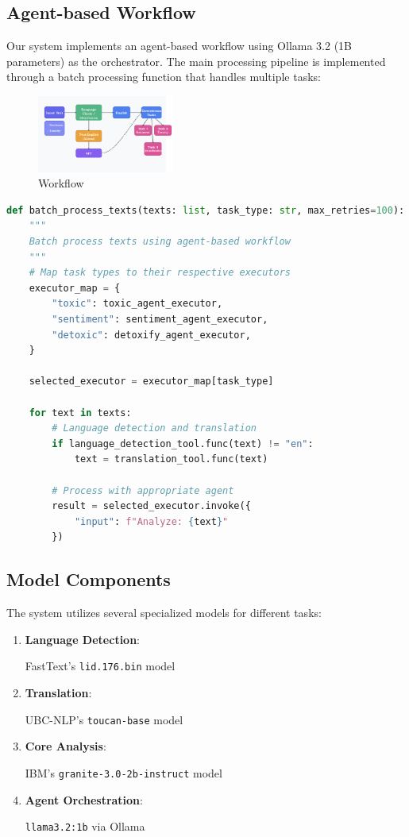 \documentclass[11pt]{article}
\begin{document}
\subsection{Agent-based Workflow}
Our system implements an agent-based workflow using Ollama 3.2 (1B parameters) as the orchestrator. The main processing pipeline is implemented through a batch processing function that handles multiple tasks:
\begin{figure}[htbp]
    \centering
    \includegraphics[width=0.4\textwidth]{imgs/workflow.png} %
    \caption{Workflow}
    \label{fig:workflow}
\end{figure}

\begin{lstlisting}[language=Python]
def batch_process_texts(texts: list, task_type: str, max_retries=100):
    """
    Batch process texts using agent-based workflow
    """
    # Map task types to their respective executors
    executor_map = {
        "toxic": toxic_agent_executor,
        "sentiment": sentiment_agent_executor,
        "detoxic": detoxify_agent_executor,
    }
    
    selected_executor = executor_map[task_type]
    
    for text in texts:
        # Language detection and translation
        if language_detection_tool.func(text) != "en":
            text = translation_tool.func(text)
            
        # Process with appropriate agent
        result = selected_executor.invoke({
            "input": f"Analyze: {text}"
        })
\end{lstlisting}

\subsection{Model Components}
The system utilizes several specialized models for different tasks:

\begin{enumerate}
    \item \textbf{Language Detection}: 
    
    FastText's \texttt{lid.176.bin} model
    \item \textbf{Translation}: 
    
    UBC-NLP's \texttt{toucan-base} model
    \item \textbf{Core Analysis}: 
    
    IBM's \texttt{granite-3.0-2b-instruct} model
    \item \textbf{Agent Orchestration}: 
    
    \texttt{llama3.2:1b} via Ollama
\end{enumerate}
\end{document}

